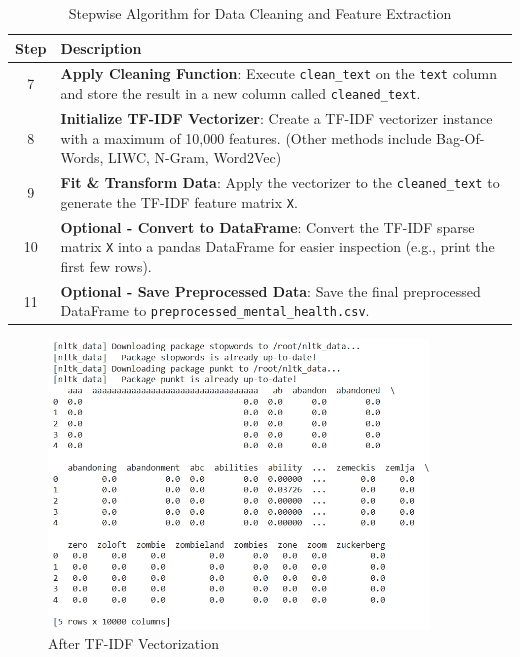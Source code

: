 \begin{table}[H]
    \caption*{Stepwise Algorithm for Data Cleaning and Feature Extraction}
    \label{tab:algorithm}
    \centering
    \begin{tabularx}{\textwidth}{|c|X|}
    \hline
    \textbf{Step} & \textbf{Description} \\
    \hline
    7 & \textbf{Apply Cleaning Function}: Execute \texttt{clean\_text} on the \texttt{text} column and store the result in a new column called \texttt{cleaned\_text}. \\
    \hline
    8 & \textbf{Initialize TF-IDF Vectorizer}: Create a TF-IDF vectorizer instance with a maximum of 10,000 features. (Other methods include Bag-Of-Words, LIWC, N-Gram, Word2Vec)\\
    \hline
    9 & \textbf{Fit \& Transform Data}: Apply the vectorizer to the \texttt{cleaned\_text} to generate the TF-IDF feature matrix \texttt{X}. \\
    \hline
    10 & \textbf{Optional - Convert to DataFrame}: Convert the TF-IDF sparse matrix \texttt{X} into a pandas DataFrame for easier inspection (e.g., print the first few rows). \\
    \hline
    11 & \textbf{Optional - Save Preprocessed Data}: Save the final preprocessed DataFrame to \texttt{preprocessed\_mental\_health.csv}. \\
    \hline
    \end{tabularx}
\end{table}

\begin{figure}[h!]  
    \centering
    \includegraphics[width=0.9\textwidth]{Images/Data Cleaning and Preprocessing.png}  
    \caption{After TF-IDF Vectorization}
    \label{Data Collection and Preprocessing}  %
\end{figure}

